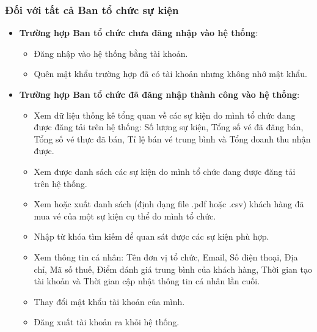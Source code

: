 \subsubsection{Đối với tất cả Ban tổ chức sự kiện}
\begin{itemize}
    \item[\textbf{-}] \textbf{Trường hợp Ban tổ chức chưa đăng nhập vào hệ thống}:
        \begin{itemize}
            \item[+] Đăng nhập vào hệ thống bằng tài khoản.
            \item[+] Quên mật khẩu trường hợp đã có tài khoản nhưng không nhớ mật khẩu.
        \end{itemize}
    \item[\textbf{-}] \textbf{Trường hợp Ban tổ chức đã đăng nhập thành công vào hệ thống}:
        \begin{itemize}
            \item[+] Xem dữ liệu thống kê tổng quan về các sự kiện do mình tổ chức đang được đăng tải trên hệ thống: Số lượng sự kiện, Tổng số vé đã đăng bán, Tổng số vé thực đã bán, Tỉ lệ bán vé trung bình và Tổng doanh thu nhận được.
            \item[+] Xem được danh sách các sự kiện do mình tổ chức đang được đăng tải trên hệ thống.
            \item[+] Xem hoặc xuất danh sách (định dạng file .pdf hoặc .csv) khách hàng đã mua vé của một sự kiện cụ thể do mình tổ chức.
            \item[+] Nhập từ khóa tìm kiếm để quan sát được các sự kiện phù hợp.
            \item[+] Xem thông tin cá nhân: Tên đơn vị tổ chức, Email, Số điện thoại, Địa chỉ, Mã số thuế, Điểm đánh giá trung bình của khách hàng, Thời gian tạo tài khoản và Thời gian cập nhật thông tin cá nhân lần cuối.
            \item[+] Thay đổi mật khẩu tài khoản của mình.
            \item[+] Đăng xuất tài khoản ra khỏi hệ thống.
        \end{itemize}
\end{itemize}
